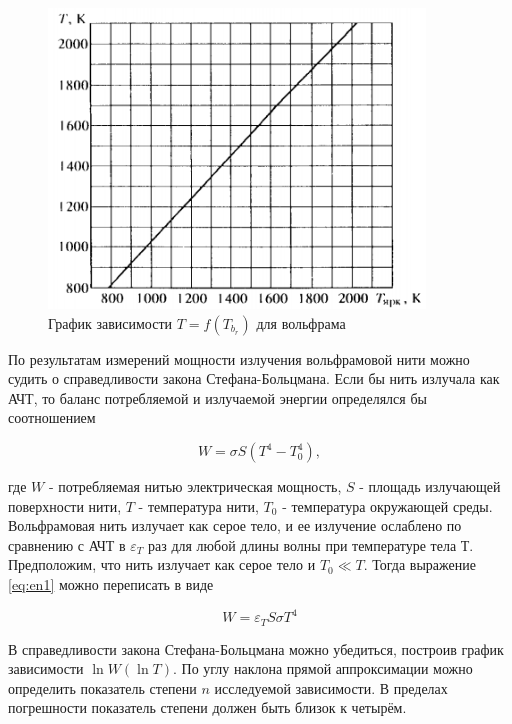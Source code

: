 \documentclass[12pt]{article}
\begin{document}
    \begin{figure}[h]
        \centering
        \includegraphics[width=10cm]{fig2.png}
        \caption{График зависимости $T = f(T_{b_r})$ для вольфрама}
        \label{fig:volfram}
    \end{figure}

    По результатам измерений мощности излучения вольфрамовой нити можно судить
    о справедливости закона Стефана-Больцмана. Если бы нить излучала как АЧТ, то
    баланс потребляемой и излучаемой энергии определялся бы соотношением

    \begin{equation} \label{eq:en1}
        W = \sigma S (T^4 - T_0^4),
    \end{equation}

    где $W$ - потребляемая нитью электрическая мощность, $S$ - площадь
    излучающей поверхности нити, $T$ - температура нити, $T_0$ - температура
    окружающей среды. Вольфрамовая нить излучает как серое тело, и ее излучение
    ослаблено по сравнению с АЧТ в $\varepsilon_T$ раз для любой длины
    волны при температуре тела Т. Предположим, что нить излучает
    как серое тело и $T_0 \ll T$. Тогда выражение
    \ref{eq:en1} можно переписать в виде

    \begin{equation} \label{eq:en2}
        W = \varepsilon_T S \sigma T^4
    \end{equation}

    В справедливости закона Стефана-Больцмана можно убедиться, построив график
    зависимости $\ln W(\ln T)$. По углу наклона прямой аппроксимации можно
    определить показатель степени $n$ исследуемой зависимости. В пределах
    погрешности показатель степени должен быть близок к четырём.
\end{document}
